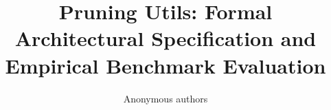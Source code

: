 \title{\textbf{Pruning Utils: Formal Architectural Specification and Empirical Benchmark Evaluation}}

\author{Anonymous authors}
